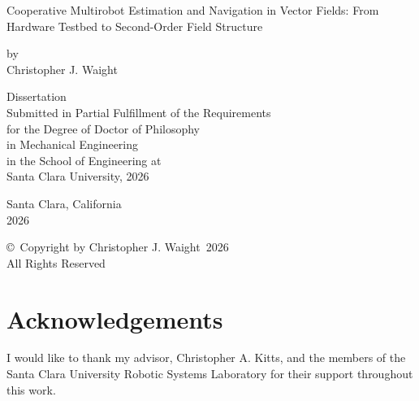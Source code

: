 \documentclass[12pt, letterpaper, oneside]{report}
\newcommand{\thesistitle}{Cooperative Multirobot Estimation and Navigation in Vector Fields: From Hardware Testbed to Second-Order Field Structure}
\newcommand{\thesisauthor}{Christopher J. Waight}
\newcommand{\thesisdegreefield}{Mechanical Engineering}
\newcommand{\thesisyear}{2026}
\begin{document}
\clearpage
{}
\setcounter{page}{1}

\thispagestyle{empty}
\begin{center}
  \vspace*{1in}

  {\Large \thesistitle}

  \vspace{0.6in}
  by \\[6pt]
  \thesisauthor

  \vspace{1.2in}
  Dissertation \\[6pt]
  Submitted in Partial Fulfillment of the Requirements \\
  for the Degree of Doctor of Philosophy \\
  in \thesisdegreefield \\[6pt]
  in the School of Engineering at \\
  Santa Clara University, \thesisyear

  \vspace{1in}
  Santa Clara, California \\
  \thesisyear
\end{center}
\clearpage

\clearpage
\thispagestyle{plain}
\vspace*{3in}
\begin{center}
  \copyright\ Copyright by \thesisauthor\ \thesisyear \\
  All Rights Reserved
\end{center}
\clearpage

\chapter*{Acknowledgements}


I would like to thank my advisor, Christopher A. Kitts, and the members of
the Santa Clara University Robotic Systems Laboratory for their support
throughout this work.
\end{document}
